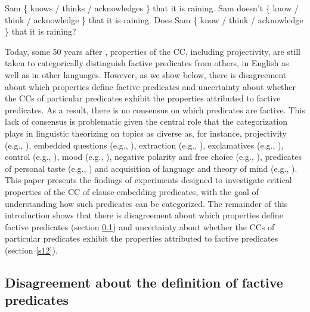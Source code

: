 \documentclass[11pt,fleqn]{article}
\newcommand{\6}{\mbox{$[\hspace*{-.6mm}[$}}
\newcommand{\9}{\mbox{$]\hspace*{-.6mm}]$}}
\begin{document}
\begin{exe}
\ex\label{kk1}
\begin{xlist}
\ex Sam \{ knows / thinks / acknowledges \} that it is raining.
\ex Sam doesn't \{ know / think / acknowledge \} that it is raining.
\ex Does Sam \{ know / think / acknowledge \} that it is raining?
\end{xlist}
\end{exe}
Today, some 50 years after \citealt{kiparsky-kiparsky70}, properties of the CC, including projectivity, are still taken to categorically distinguish factive predicates from others, in English as well as in other languages. However, as we show below, there is disagreement about which properties define factive predicates and uncertainty about whether the CCs of particular predicates exhibit the properties attributed to factive predicates. As a result, there is no consensus on which predicates are factive. This lack of consensus is problematic given the central role that the categorization plays in linguistic theorizing on topics as diverse as, for instance, projectivity (e.g., \citealt{karttunen-peters79,vds92}), embedded questions (e.g., \citealt{hintikka1975,guerzoni-sharvit2007,spector-egre2015}), extraction (e.g., \citealt{hukari-levine1995,rooryck2000,abrusan2014}), exclamatives (e.g., \citealt{zanuttini-portner2003}), control (e.g., \citealt{landau2001}), mood (e.g., \citealt{van-gelderen2004,givon95,heycock2006}), negative polarity and free choice (e.g., \citealt{giannakidou1998,giannakidou2001}), predicates of personal taste (e.g., \citealt{lasersohn2009}) and acquisition of language and theory of mind (e.g., \citealt{devillers2005}). 
This paper presents the findings of experiments designed to investigate critical properties of the CC of clause-embedding predicates, with the goal of understanding how such predicates can be categorized. The remainder of this introduction shows that there is disagreement about which properties define factive predicates (section \ref{s11}) and uncertainty about whether the CCs of particular predicates exhibit the properties attributed to factive predicates (section \ref{s12}).

\subsection{Disagreement about the definition of factive predicates}\label{s11}
\end{document}
